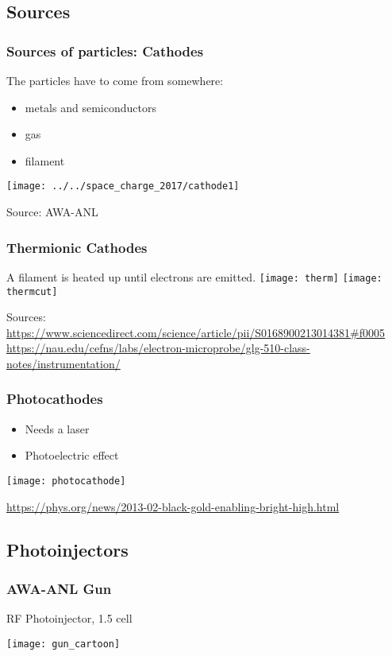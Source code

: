 \documentclass[professionalfonts,t]{beamer}
\begin{document}
\subsection{Sources}
\begin{frame}
\frametitle{Sources of particles: Cathodes}
The particles have to come from somewhere:
\begin{itemize}
	\item metals and semiconductors
	\item gas
	\item filament
\end{itemize} 
\hfill \texttt{[image: ../../space\_charge\_2017/cathode1]}%

\hfill Source: AWA-ANL

\end{frame}



\begin{frame}
	\frametitle{Thermionic Cathodes}
	\vspace{-0.75em}
	
	A filament is heated up until electrons are emitted.
	\texttt{[image: therm]}%
	\texttt{[image: thermcut]}
	
	\tiny
	Sources: \url{https://www.sciencedirect.com/science/article/pii/S0168900213014381\#f0005}
	\url{https://nau.edu/cefns/labs/electron-microprobe/glg-510-class-notes/instrumentation/}
	
	
\end{frame}


\begin{frame}
\frametitle{Photocathodes}
\vspace{-1em}
\begin{itemize}
	\item Needs a laser
	\item Photoelectric effect
\end{itemize}

\centering
\texttt{[image: photocathode]}

\tiny
\url{https://phys.org/news/2013-02-black-gold-enabling-bright-high.html}
\end{frame}

\subsection{Photoinjectors}
\begin{frame}
\frametitle{AWA-ANL Gun}
\centering
RF Photoinjector, 1.5 cell

\vspace{1em}
\texttt{[image: gun\_cartoon]}
\end{frame}
\end{document}
